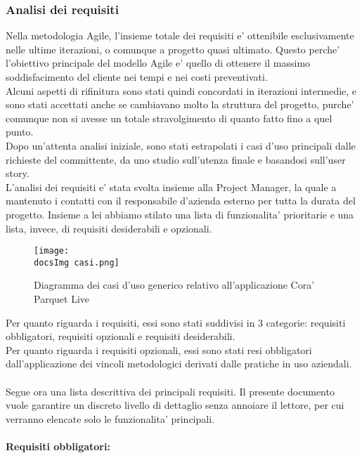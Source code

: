 \subsubsection{Analisi dei requisiti}
Nella metodologia Agile, l'insieme totale dei requisiti e' ottenibile esclusivamente nelle ultime iterazioni, o comunque a progetto quasi ultimato. Questo perche' l'obiettivo principale del modello Agile e' quello di ottenere il massimo soddisfacimento del cliente nei tempi e nei costi preventivati.\\
Alcuni aspetti di rifinitura sono stati quindi concordati in iterazioni intermedie, e sono stati accettati anche se cambiavano molto la struttura del progetto, purche' comunque non si avesse un totale stravolgimento di quanto fatto fino a quel punto.\\
Dopo un'attenta analisi iniziale, sono stati estrapolati i casi d'uso principali dalle richieste del committente, da uno studio sull'utenza finale e basandosi sull'user story.\\
L'analisi dei requisiti e' stata svolta insieme alla Project Manager, la quale a mantenuto i contatti con il responsabile d'azienda esterno per tutta la durata del progetto. Insieme a lei abbiamo stilato una lista di funzionalita' prioritarie e una lista, invece, di requisiti desiderabili e opzionali.

\begin{figure}[H]
	\centering
	\texttt{[image: \\docsImg casi.png]}
	\caption{Diagramma dei casi d'uso generico relativo all'applicazione Cora' Parquet Live}
	\label{fig:Diagramma dei casi d'uso generico relativo all'applicazione Cora' Parquet Live}
\end{figure}

Per quanto riguarda i requisiti, essi sono stati suddivisi in 3 categorie: requisiti obbligatori, requisiti opzionali e requisiti desiderabili.\\
Per quanto riguarda i requisiti opzionali, essi sono stati resi obbligatori dall'applicazione dei vincoli metodologici derivati dalle pratiche in uso aziendali.\\\\
Segue ora una lista descrittiva dei principali requisiti. Il presente documento vuole garantire un discreto livello di dettaglio senza annoiare il lettore, per cui verranno elencate solo le funzionalita' principali.\\\\

\textbf{Requisiti obbligatori:}

